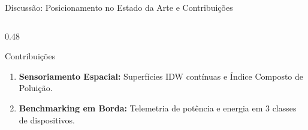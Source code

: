 \documentclass[aspectratio=169,10pt]{beamer}
\begin{document}
\begin{frame}{Discussão: Posicionamento no Estado da Arte e Contribuições}
\begin{columns}[T,onlytextwidth]
\begin{column}{0.48\linewidth}
\begin{exampleblock}{Contribuições}
\begin{enumerate}
          \vspace{0.08cm}
          \item \textbf{Sensoriamento Espacial:} Superfícies IDW contínuas e Índice Composto de Poluição.
          \vspace{0.08cm}
          \item \textbf{Benchmarking em Borda:} Telemetria de potência e energia em 3 classes de dispositivos.
        \end{enumerate}
      \end{exampleblock}
    \end{column}
  \end{columns}
\end{frame}

\end{document}

